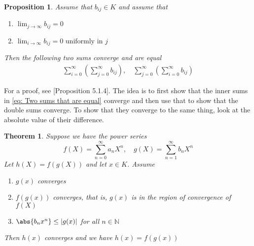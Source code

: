 \documentclass{article}
\newtheorem{theorem}{Theorem}[section]
\newtheorem{proposition}{Proposition}[section]
\newcommand{\mbb}[1]{\mathbb{#1}}
\numberwithin{equation}{section}
\begin{document}
\begin{proposition}\label{prop: Swap of summation}
    Assume that $b_{ij} \in K$ and assume that
    \begin{enumerate}
        \item $\lim_{j \to \infty}b_{ij} = 0$
        \item $\lim_{i \to \infty} b_{ij} = 0 \text{ uniformly in } j$
    \end{enumerate}
    Then the following two sums converge and are equal
    \begin{equation}\label{eq: Two sums that are equal}
        \begin{aligned}
            \sum_{i = 0}^\infty (\sum_{j = 0}^\infty b_{ij}), \quad \sum_{j = 0}^\infty (\sum_{i = 0}^\infty b_{ij})
        \end{aligned}
    \end{equation}
\end{proposition}
For a proof, see \citep{gouvea}[Proposition 5.1.4]. The idea is to first show that the inner sums in \cref{eq: Two sums that are equal} converge and then use that to show that the double sums converge. To show that they converge to the same thing, look at the absolute value of their difference.
\begin{theorem}\label{prop: The composite of formal power series converges}
    Suppose we have the power series
    $$f(X) = \sum_{n=0}^\infty a_n X^n, \quad g(X) = \sum_{n=1}^\infty b_n X^n$$
    Let $h(X) = f(g(X))$ and let $x \in K$. Assume
    \begin{enumerate}
        \item $g(x)$ converges
        \item $f(g(x))$ converges, that is, $g(x)$ is in the region of convergence of $f(X)$
        \item $\abs{b_n x^n} \leq |g(x)|$ for all $n \in \mbb N$
    \end{enumerate}
    Then $h(x)$ converges and we have $h(x) = f(g(x))$
\end{theorem}
\end{document}
